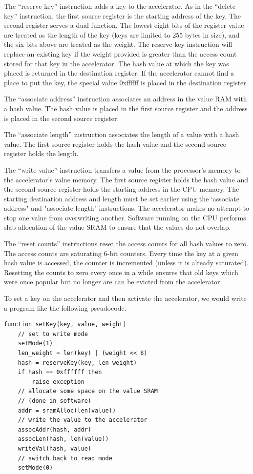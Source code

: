 The ``reserve key'' instruction adds a key to the accelerator. As in the
``delete key'' instruction, the first source register is the starting address
of the key. The second register serves a dual function. The lowest eight
bits of the register value are treated as the length of the key (keys are
limited to 255 bytes in size), and the six bits above are treated as the
weight. The reserve key instruction will replace an existing key if the
weight provided is greater than the access count stored for that key in the
accelerator. The hash value at which the key was placed is returned in the
destination register. If the accelerator cannot find a place to put the key,
the special value 0xffffff is placed in the destination register.

The ``associate address'' instruction associates an address in the value RAM
with a hash value. The hash value is placed in the first source register and
the address is placed in the second source register.

The ``associate length'' instruction associates the length of a value with a hash
value. The first source register holds the hash value and the second source
register holds the length.

The ``write value'' instruction transfers a value from the processor's memory to
the accelerator's value memory. The first source register holds the hash value
and the second source register holds the starting address in the CPU memory.
The starting destination address and length must be set earlier using the
`associate address" and "associate length" instructions. The accelerator makes
no attempt to stop one value from overwriting another. Software running on the
CPU performs slab allocation of the value SRAM to ensure that the values do
not overlap.

The ``reset counts'' instructions reset the access counts for all hash values
to zero. The access counts are saturating 6-bit counters. Every time the key
at a given hash value is accessed, the counter is incremented (unless it is
already saturated). Resetting the counts to zero every once in a while ensures
that old keys which were once popular but no longer are can be evicted from
the accelerator.

To set a key on the accelerator and then activate the accelerator, we would
write a program like the following pseudocode.

\begin{verbatim}
function setKey(key, value, weight)
    // set to write mode
    setMode(1)
    len_weight = len(key) | (weight << 8)
    hash = reserveKey(key, len_weight)
    if hash == 0xffffff then
        raise exception
    // allocate some space on the value SRAM
    // (done in software)
    addr = sramAlloc(len(value))
    // write the value to the accelerator
    assocAddr(hash, addr)
    assocLen(hash, len(value))
    writeVal(hash, value)
    // switch back to read mode
    setMode(0)
\end{verbatim}
